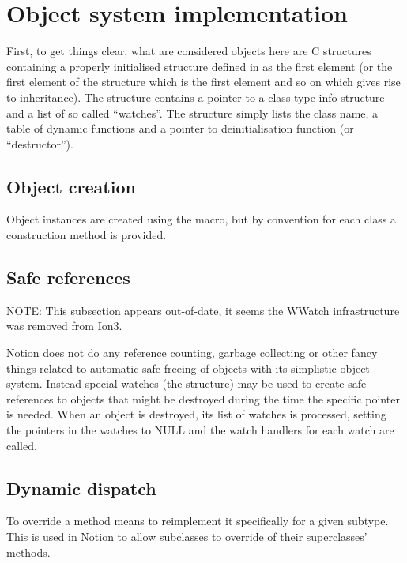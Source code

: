 \section{Object system implementation}

First, to get things clear, what are considered objects here are C
structures containing a properly initialised \type{}
structure defined in  as the first element (or the
first element of the structure which is the first element and so on which
gives rise to inheritance). The  structure contains a pointer
to a  class type info structure and
a list of so called ``watches''. The  structure simply
lists the class name, a table of dynamic functions and a pointer to
deinitialisation function (or ``destructor'').

\subsection{Object creation}

Object instances are created using the  macro, but
by convention for each class  a construction method 
 is provided.

\subsection{Safe references}

NOTE: This subsection appears out-of-date, it seems the WWatch infrastructure
was removed from Ion3.

Notion does not do any reference counting, garbage collecting or other
fancy things related to automatic safe freeing of objects with its
simplistic object system. Instead special watches (the 
 structure) may be used to create safe references to
objects that might be destroyed during the time the specific pointer is
needed. When an object is destroyed, its list of watches is processed,
setting the pointers in the watches to NULL and the watch handlers for
each watch are called. 

\subsection{Dynamic dispatch}

To override a method means to reimplement it specifically for a given subtype.
This is used in Notion to allow subclasses to override of their superclasses' 
methods.

